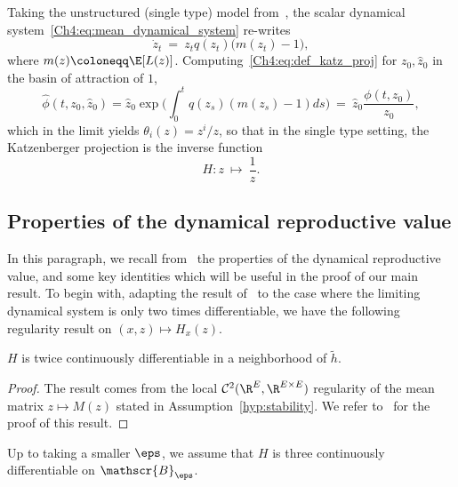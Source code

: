 \begin{refsegment}
\begin{rem}
Taking the unstructured (single type) model from~\cite{AFRS_2025}, the scalar dynamical system~\eqref{Ch4:eq:mean_dynamical_system} re-writes 
\[ \dot z_t\ =\ z_t q(z_t)\big(m(z_t)-1\big),\]
where $m(z)\coloneqq \E[L(z)]$. 
Computing~\eqref{Ch4:eq:def_katz_proj} for $z_0,\hat z_0$ in the basin of attraction of $1$, 
\[
\hat\phi(t,z_0,\hat z_0)= \hat z_0\exp\Big(\int_0^t q(z_s)(m(z_s)-1)ds\Big)\ =\ \hat z_0 \frac{\phi(t,z_0)}{z_0},
\]
which in the limit yields $\theta_{i}(z)=z^i/z$, so that in the single type setting, the Katzenberger projection is the inverse function
\[
H: z\ \longmapsto\ \frac{1}{z}.
\]
\end{rem}


\subsection{Properties of the dynamical reproductive value}\label{Ch4:sec:katz_properties}
In this paragraph, we recall from~\cite{Julie_Zsofia} the properties of the dynamical reproductive value, and some key identities which will be useful in the proof of our main result.
To begin with, adapting the result of~\citet[Lemma~10, Appendix~C]{Julie_Zsofia} to the case where the limiting dynamical system is only two times differentiable, we have the following regularity result on $(x,z)\mapsto H_x(z)$.
\begin{lem}
$H$ is twice continuously differentiable in a neighborhood of $\tilde{h}$.
\end{lem}
\begin{proof}
The result comes from the local $\mathcal{C}^2(\R^E, \R^{E\times E})$ regularity of the mean matrix $z\mapsto M(z)$ stated in Assumption~\ref{hyp:stability}. We refer to~\citet[Lemma~10, appendix~C]{Julie_Zsofia} for the proof of this result.
\end{proof}
Up to taking a smaller $\eps$, we assume that $H$ is three continuously differentiable on $\mathscr{B}_{\eps}$.


\end{refsegment}
